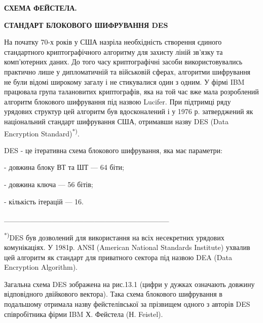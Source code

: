 {\centering\bfseries
СХЕМА  ФЕЙСТЕЛА. 
\par}

{\centering\bfseries
СТАНДАРТ  БЛОКОВОГО  ШИФРУВАННЯ  DES
\par}


\bigskip


\bigskip

На початку 70-х років у США назріла необхідність створення єдиного стандартного
криптографічного алгоритму для захисту ліній зв’язку та комп’ютерних даних. До
того часу криптографічні засоби використовувались практично лише у
дипломатичній та військовій сферах, алгоритми шифрування не були відомі
широкому загалу і не стикувалися один з одним. У фірмі IBM працювала група
талановитих криптографів, яка на той час вже мала розроблений алгоритм
блокового шифрування під назвою Lucifer. При підтримці ряду урядових структур
цей алгоритм був вдосконалений і у 1976 р.  затверджений як  національний
стандарт шифрування США, отримавши назву DES (Data Encryption
Standard)\textsuperscript{*)}. 

DES -  це ітеративна схема блокового шифрування, яка має параметри:

 {}- довжина блоку ВТ та ШТ --- 64 біти;

 {}- довжина ключа --- 56 бітів;

 {}- кількість ітерацій --- 16. 


\bigskip

\_\_\_\_\_\_\_\_\_\_\_\_\_\_\_\_\_\_\_\_\_\_\_\_\_\_\_\_\_\_\_

\textsuperscript{ *)}DES був дозволений для використання на всіх несекретних
урядових комунікаціях. У 1981р. ANSI (American National Standards Institute)
ухвалив цей алгоритм як стандарт для приватного сектора під назвою DEA (Data
Encryption Algorithm).   

Загальна схема DES зображена на рис.13.1 (цифри у дужках означають довжину
відповідного двійкового вектора). Така схема блокового шифрування  в подальшому
отримала назву фейстелівської за прізвищем одного з  авторів DES співробітника
фірми IBM Х. Фейстела (Н. Feistel).

